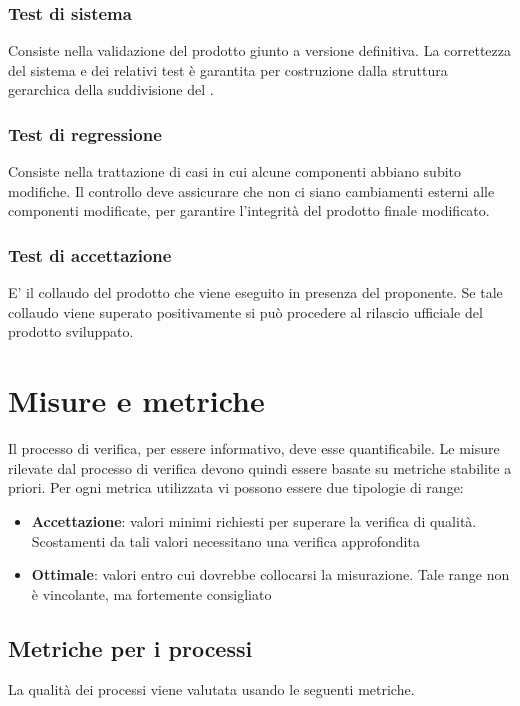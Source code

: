 \documentclass[12pt,a4paper]{article}
\begin{document}
\subsubsection{Test di sistema}
Consiste nella validazione del prodotto giunto a versione definitiva. La correttezza del sistema e dei relativi test è garantita per costruzione dalla struttura gerarchica della suddivisione del .
\subsubsection{Test di regressione}
Consiste nella trattazione di casi in cui alcune componenti abbiano subito modifiche. Il controllo deve assicurare che non ci siano cambiamenti esterni alle componenti modificate, per garantire l'integrità del prodotto finale modificato.
\subsubsection{Test di accettazione}
E' il collaudo del prodotto  che viene eseguito in presenza del proponente. Se tale collaudo viene superato positivamente si può procedere al rilascio ufficiale del prodotto sviluppato. 

\newpage
\section{Misure e metriche}\label{metriche}
Il processo di verifica, per essere informativo, deve esse quantificabile. Le misure rilevate dal processo di verifica devono quindi essere basate su metriche stabilite a priori. Per ogni metrica utilizzata vi possono essere due tipologie di range:
\begin{itemize}
\item \textbf{Accettazione}: valori minimi richiesti per superare la verifica di qualità. Scostamenti da tali valori necessitano una verifica approfondita
\item \textbf{Ottimale}: valori entro cui dovrebbe collocarsi la misurazione. Tale range non è vincolante, ma fortemente consigliato
\end{itemize}

\subsection{Metriche per i processi}\label{metriche_processi}
La qualità dei processi viene valutata usando le seguenti metriche.
\end{document}
